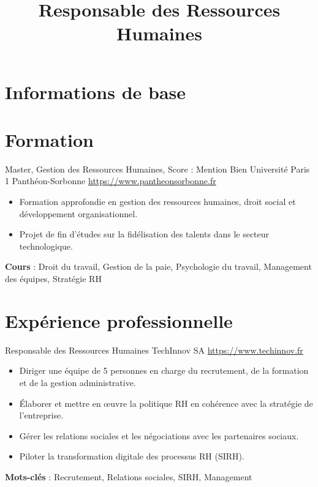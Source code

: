 \documentclass[a4paper, serif, 10pt]{moderncv}
\title{Responsable des Ressources Humaines}
\begin{document}
\maketitle

\section{Informations de base}

\section{Formation}

        {Master, Gestion des Ressources Humaines, Score : Mention Bien}
        {Université Paris 1 Panthéon-Sorbonne}
        {\url{https://www.pantheonsorbonne.fr}}
        {}
        {\begin{itemize}
\item Formation approfondie en gestion des ressources humaines, droit social et développement organisationnel.
\item Projet de fin d'études sur la fidélisation des talents dans le secteur technologique.
\end{itemize}
\textbf{Cours} : Droit du travail, Gestion de la paie, Psychologie du travail, Management des équipes, Stratégie RH}
\section{Expérience professionnelle}

        {Responsable des Ressources Humaines}
        {TechInnov SA}
        {\url{https://www.techinnov.fr}}
        {}
        {\begin{itemize}
\item Diriger une équipe de 5 personnes en charge du recrutement, de la formation et de la gestion administrative.
\item Élaborer et mettre en œuvre la politique RH en cohérence avec la stratégie de l'entreprise.
\item Gérer les relations sociales et les négociations avec les partenaires sociaux.
\item Piloter la transformation digitale des processus RH (SIRH).
\end{itemize}
\textbf{Mots-clés} : Recrutement, Relations sociales, SIRH, Management}
\end{document}
